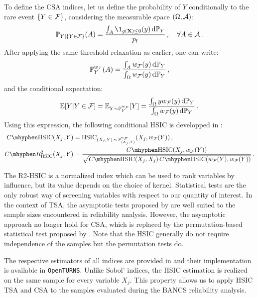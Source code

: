 To define the CSA indices, let us define the probability of $Y$ conditionally to the rare event $\{Y \in \mathcal{F}\}$, considering the measurable space $(\Omega, \mathcal{A})$:
\begin{equation}
    \P_{Y|\{Y\in\iF\}}(A) = \frac{\int_{A} \1_{g(\bX)\leq0}(y) \, \dd \P_Y}{\pf}\,, \quad \forall A \in \iA\,.
\end{equation}
After applying the same threshold relaxation as earlier, one can write: 
\begin{equation}
    \mathbb{P}_Y^{w_{\mathcal{F}}}(A)= \frac{\int_A w_{\mathcal{F}}(y) \, \mathrm{d} \mathbb{P}_Y}{\int_{\Omega} w_{\mathcal{F}}(y) \, \mathrm{d} \mathbb{P}_Y} \, ,
\end{equation}
and the conditional expectation: 
\begin{equation}
    \mathbb{E}[Y|Y \in \mathcal{F}] = \mathbb{E}_{Y\sim\mathbb{P}_Y^{w_{\mathcal{F}}}}[Y] = \frac{\int_\Omega y w_{\mathcal{F}}(y) \, \mathrm{d} \mathbb{P}_Y}{\int_{\Omega} w_{\mathcal{F}}(y) \, \mathrm{d} \mathbb{P}_Y}\, .
\end{equation}
Using this expression, the following conditional HSIC is developped in \citet{marrel_chabridon_2021}:
\begin{subequations}
    \begin{align}
        C \mhyphen \HSIC(X_j, Y) & = \HSIC_{(X_j, Y) \,\sim\, \P_{(X_j, Y)}^{w_{\iF}}} (X_j, w_{\iF}(Y)) \, ,\\
        C \mhyphen R^2_{\HSIC}(X_j, Y) &= \frac{C \mhyphen \HSIC(X_j, w_{\iF}(Y))}{\sqrt{C \mhyphen \HSIC(X_j, X_j) \, C \mhyphen \HSIC(w_{\iF}(Y), w_{\iF}(Y))}}\, .
    \end{align}
\end{subequations}

The R2-HSIC is a normalized index which can be used to rank variables by influence, but its value depends on the choice of kernel. 
Statistical tests are the only robust way of screening variables with respect to our quantity of interest. 
In the context of TSA, the asymptotic tests proposed by \citet{gretton_2006} are well suited to the sample sizes encountered in reliability analysis. 
However, the asymptotic approach no longer hold for CSA, which is replaced by the permutation-based statistical test proposed by \citet{delozzo_2016_hsic_test}.
Note that the HSIC generally do not require independence of the samples but the permutation tests do. 

The respective estimators of all indices are provided in \citet{marrel_chabridon_2021} and their implementation is available in \texttt{OpenTURNS}.
Unlike Sobol' indices, the HSIC estimation is realized on the same sample for every variable $X_j$. 
This property allows us to apply HSIC TSA and CSA to the samples evaluated during the BANCS reliability analysis.


